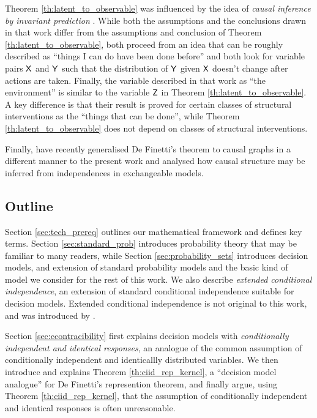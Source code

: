 \documentclass{article}
\begin{document}
Theorem \ref{th:latent_to_observable} was influenced by the idea of \emph{causal inference by invariant prediction} \citep{peters_causal_2016}. While both the assumptions and the conclusions drawn in that work differ from the assumptions and conclusion of Theorem \ref{th:latent_to_observable}, both proceed from an idea that can be roughly described as ``things I can do have been done before'' and both look for variable pairs $\mathsf{X}$ and $\mathsf{Y}$ such that the distribution of $\mathsf{Y}$ given $\mathsf{X}$ doesn't change after actions are taken. Finally, the variable described in that work as ``the environment'' is similar to the variable $\mathsf{Z}$ in Theorem \ref{th:latent_to_observable}. A key difference is that their result is proved for certain classes of structural interventions as the ``things that can be done'', while Theorem \ref{th:latent_to_observable} does not depend on classes of structural interventions.

Finally, \citet{guoCausalFinettiIdentification2022} have recently generalised De Finetti's theorem to causal graphs in a different manner to the present work and analysed how causal structure may be inferred from independences in exchangeable models.

\subsection{Outline}

Section \ref{sec:tech_prereq} outlines our mathematical framework and defines key terms. Section \ref{sec:standard_prob} introduces probability theory that may be familiar to many readers, while Section \ref{sec:probability_sets} introduces decision models, and extension of standard probability models and the basic kind of model we consider for the rest of this work. We also describe \emph{extended conditional independence}, an extension of standard conditional independence suitable for decision models. Extended conditional independence is not original to this work, and was introduced by \citet{constantinou_extended_2017}.

Section \ref{sec:ccontracibility} first explains decision models with \emph{conditionally independent and identical responses}, an analogue of the common assumption of conditionally independent and identicallly distributed variables. We then introduce and explains Theorem \ref{th:ciid_rep_kernel}, a ``decision model analogue'' for De Finetti's represention theorem, and finally argue, using Theorem \ref{th:ciid_rep_kernel}, that the assumption of conditionally independent and identical responses is often unreasonable.
\end{document}
